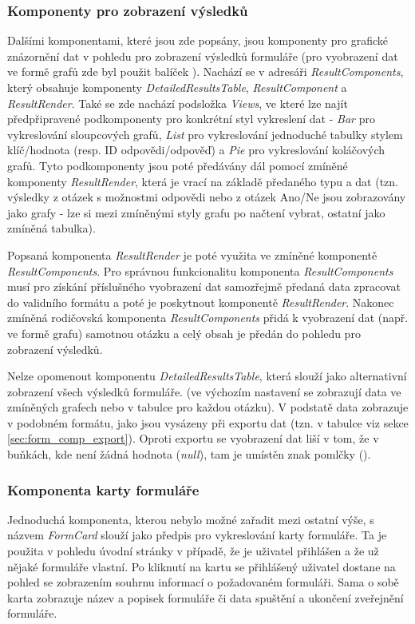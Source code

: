 		\subsubsection{Komponenty pro zobrazení výsledků} %
		Dalšími komponentami, které jsou zde popsány, jsou komponenty pro grafické znázornění dat v pohledu pro zobrazení výsledků formuláře (pro vyobrazení dat ve formě grafů zde byl použit balíček ). Nachází se v adresáři \textit{ResultComponents}, který obsahuje komponenty \textit{DetailedResultsTable}, \textit{ResultComponent} a \textit{ResultRender}. Také se zde nachází podsložka \textit{Views}, ve které lze najít předpřipravené podkomponenty pro konkrétní styl vykreslení dat - \textit{Bar} pro vykreslování sloupcových grafů, \textit{List} pro vykreslování jednoduché tabulky stylem klíč/hodnota (resp. ID odpovědi/odpověď) a \textit{Pie} pro vykreslování koláčových grafů. Tyto podkomponenty jsou poté předávány dál pomocí zmíněné komponenty \textit{ResultRender}, která je vrací na základě předaného typu a dat (tzn. výsledky z otázek s možnostmi odpovědi nebo z otázek Ano/Ne jsou zobrazovány jako grafy - lze si mezi zmíněnými styly grafu po načtení vybrat, ostatní jako zmíněná tabulka).
		
		Popsaná komponenta \textit{ResultRender} je poté využita ve zmíněné komponentě \textit{ResultComponents}. Pro správnou funkcionalitu komponenta \textit{ResultComponents} musí pro získání příslušného vyobrazení dat samozřejmě předaná data zpracovat do validního formátu a poté je poskytnout komponentě \textit{ResultRender}. Nakonec zmíněná rodičovská komponenta \textit{ResultComponents} přidá k vyobrazení dat (např. ve formě grafu) samotnou otázku a celý obsah je předán do pohledu pro zobrazení výsledků.
		
		Nelze opomenout komponentu \textit{DetailedResultsTable}, která slouží jako alternativní zobrazení všech výsledků formuláře. (ve výchozím nastavení se zobrazují data ve zmíněných grafech nebo v tabulce pro každou otázku). V podstatě data zobrazuje v podobném formátu, jako jsou vysázeny při exportu dat (tzn. v tabulce viz sekce \ref{sec:form_comp_export}). Oproti exportu se vyobrazení dat liší v tom, že v buňkách, kde není žádná hodnota (\textit{null}), tam je umístěn znak pomlčky (\uv{-}).
		
		\subsubsection{Komponenta karty formuláře}
		Jednoduchá komponenta, kterou nebylo možné zařadit mezi ostatní výše, s názvem \textit{FormCard} slouží jako předpis pro vykreslování karty formuláře. Ta je použita v pohledu úvodní stránky v případě, že je uživatel přihlášen a že už nějaké formuláře vlastní. Po kliknutí na kartu se přihlášený uživatel dostane na pohled se zobrazením souhrnu informací o požadovaném formuláři. Sama o sobě karta zobrazuje název a popisek formuláře či data spuštění a ukončení zveřejnění formuláře.
	
